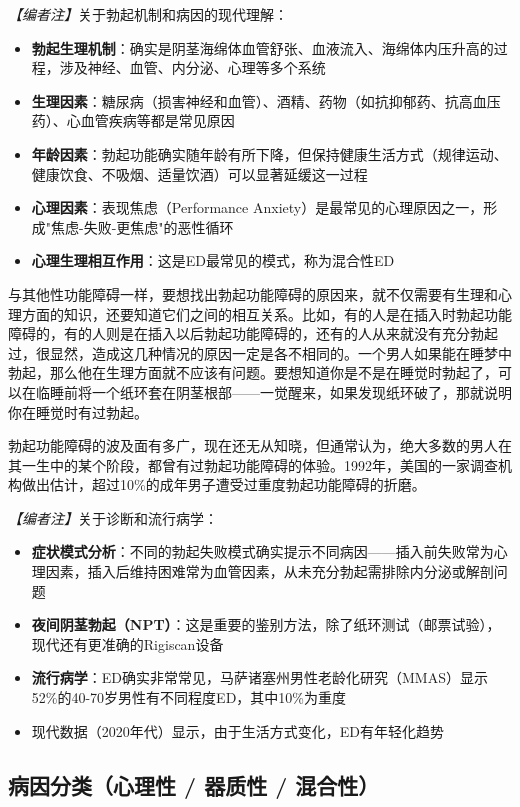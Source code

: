 \noindent\textit{【编者注】}关于勃起机制和病因的现代理解：
\begin{itemize}
	\item \textbf{勃起生理机制}：确实是阴茎海绵体血管舒张、血液流入、海绵体内压升高的过程，涉及神经、血管、内分泌、心理等多个系统
	\item \textbf{生理因素}：糖尿病（损害神经和血管）、酒精、药物（如抗抑郁药、抗高血压药）、心血管疾病等都是常见原因
	\item \textbf{年龄因素}：勃起功能确实随年龄有所下降，但保持健康生活方式（规律运动、健康饮食、不吸烟、适量饮酒）可以显著延缓这一过程
	\item \textbf{心理因素}：表现焦虑（Performance Anxiety）是最常见的心理原因之一，形成"焦虑-失败-更焦虑"的恶性循环
	\item \textbf{心理生理相互作用}：这是ED最常见的模式，称为混合性ED
\end{itemize}

与其他性功能障碍一样，要想找出勃起功能障碍的原因来，就不仅需要有生理和心理方面的知识，还要知道它们之间的相互关系。比如，有的人是在插入时勃起功能障碍的，有的人则是在插入以后勃起功能障碍的，还有的人从来就没有充分勃起过，很显然，造成这几种情况的原因一定是各不相同的。一个男人如果能在睡梦中勃起，那么他在生理方面就不应该有问题。要想知道你是不是在睡觉时勃起了，可以在临睡前将一个纸环套在阴茎根部——一觉醒来，如果发现纸环破了，那就说明你在睡觉时有过勃起。

勃起功能障碍的波及面有多广，现在还无从知晓，但通常认为，绝大多数的男人在其一生中的某个阶段，都曾有过勃起功能障碍的体验。1992年，美国的一家调查机构做出估计，超过10\%的成年男子遭受过重度勃起功能障碍的折磨。

\noindent\textit{【编者注】}关于诊断和流行病学：
\begin{itemize}
	\item \textbf{症状模式分析}：不同的勃起失败模式确实提示不同病因——插入前失败常为心理因素，插入后维持困难常为血管因素，从未充分勃起需排除内分泌或解剖问题
	\item \textbf{夜间阴茎勃起（NPT）}：这是重要的鉴别方法，除了纸环测试（邮票试验），现代还有更准确的Rigiscan设备
	\item \textbf{流行病学}：ED确实非常常见，马萨诸塞州男性老龄化研究（MMAS）显示52\%的40-70岁男性有不同程度ED，其中10\%为重度
	\item 现代数据（2020年代）显示，由于生活方式变化，ED有年轻化趋势
\end{itemize}

\subsection{病因分类（心理性 / 器质性 / 混合性）}


